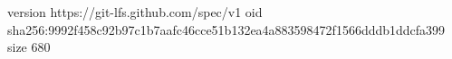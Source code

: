 version https://git-lfs.github.com/spec/v1
oid sha256:9992f458c92b97c1b7aafc46cce51b132ea4a883598472f1566dddb1ddcfa399
size 680
